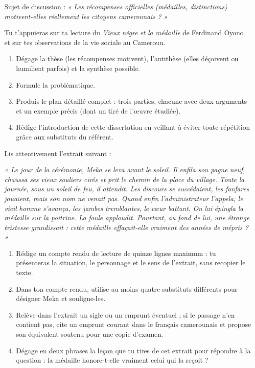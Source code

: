 \documentclass[11pt]{article}
\begin{document}
\begin{exercice}
Sujet de discussion : \emph{« Les récompenses officielles (médailles, distinctions) motivent-elles réellement les citoyens camerounais ? »}

Tu t'appuieras sur ta lecture du \emph{Vieux nègre et la médaille} de Ferdinand Oyono et sur tes observations de la vie sociale au Cameroun.
\begin{enumerate}
\item Dégage la thèse (les récompenses motivent), l'antithèse (elles déçoivent ou humilient parfois) et la synthèse possible.
\item Formule la problématique.
\item Produis le plan détaillé complet : trois parties, chacune avec deux arguments et un exemple précis (dont un tiré de l'œuvre étudiée).
\item Rédige l'introduction de cette dissertation en veillant à éviter toute répétition grâce aux substituts du référent.
\end{enumerate}
\end{exercice}

\begin{exercice}
Lis attentivement l'extrait suivant :

\emph{« Le jour de la cérémonie, Meka se leva avant le soleil. Il enfila son pagne neuf, chaussa ses vieux souliers cirés et prit le chemin de la place du village. Toute la journée, sous un soleil de feu, il attendit. Les discours se succédaient, les fanfares jouaient, mais son nom ne venait pas. Quand enfin l'administrateur l'appela, le vieil homme s'avança, les jambes tremblantes, le cœur battant. On lui épingla la médaille sur la poitrine. La foule applaudit. Pourtant, au fond de lui, une étrange tristesse grandissait : cette médaille effaçait-elle vraiment des années de mépris ? »}

\begin{enumerate}
\item Rédige un compte rendu de lecture de quinze lignes maximum : tu présenteras la situation, le personnage et le sens de l'extrait, sans recopier le texte.
\item Dans ton compte rendu, utilise au moins quatre substituts différents pour désigner Meka et souligne-les.
\item Relève dans l'extrait un sigle ou un emprunt éventuel ; si le passage n'en contient pas, cite un emprunt courant dans le français camerounais et propose son équivalent soutenu pour une copie d'examen.
\item Dégage en deux phrases la leçon que tu tires de cet extrait pour répondre à la question : la médaille honore-t-elle vraiment celui qui la reçoit ?
\end{enumerate}
\end{exercice}
\end{document}
